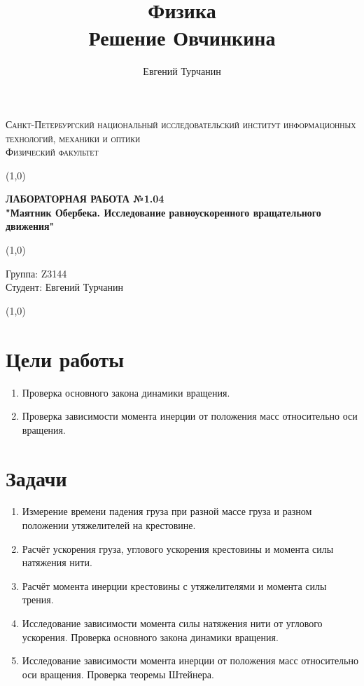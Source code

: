 \documentclass[a4paper]{article}
\title{\Huge{Физика}\\ Решение Овчинкина}
\author{\huge{Евгений Турчанин}}
\date{}
\begin{document}
\begin{center}
\textsc{Санкт-Петербургский национальный исследовательский институт информационных технологий, механики и оптики\\[3mm]
Физический факультет} \\[3mm]

\end{center}
\vspace{5mm}
\line(1,0){\textwidth}
\begin{center}
\textbf{ЛАБОРАТОРНАЯ РАБОТА №1.04\\}
\textbf{"Маятник Обербека. Исследование равноускоренного вращательного движения"}
\end{center}
\vspace{2mm}
\line(1,0){\textwidth}
\vspace{5mm}
\begin{minipage}{0.4\textwidth}
    Группа: Z3144 \\
    Студент: Евгений Турчанин\\
    \vspace{1mm}
\end{minipage}
\hfill
\vspace{1mm}
\line(1,0){\textwidth}


\section{Цели работы}
\begin{enumerate}
    \item Проверка основного закона динамики вращения.
    \item Проверка зависимости момента инерции от положения масс относительно оси вращения.
\end{enumerate}

\section{Задачи}
\begin{enumerate}
    \item Измерение времени падения груза при разной массе груза и разном положении утяжелителей на крестовине.
    \item Расчёт ускорения груза, углового ускорения крестовины и момента силы натяжения нити.
    \item Расчёт момента инерции крестовины с утяжелителями и момента силы трения.
    \item Исследование зависимости момента силы натяжения нити от углового ускорения. Проверка основного закона динамики вращения.
    \item Исследование зависимости момента инерции от положения масс относительно оси вращения. Проверка теоремы Штейнера.
\end{enumerate}
\end{document}
